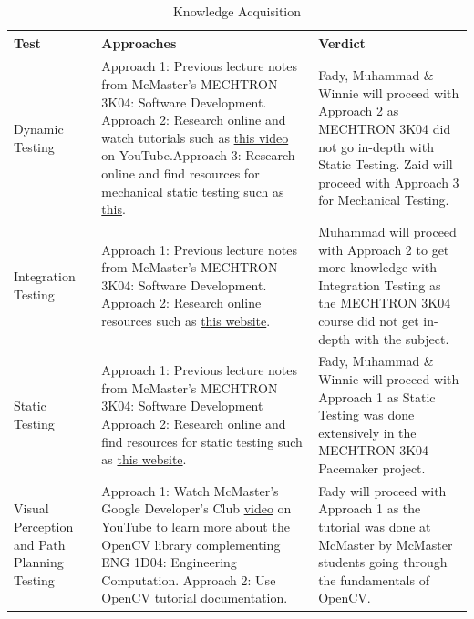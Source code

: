 \documentclass[12pt, titlepage]{article}
\begin{document}
\begin{table}[!h]
\begin{center}
\caption {Knowledge Acquisition}
\label{KnowledgeTable}

\begin{tabular}{ | m{3cm} | m{7cm} | m{4cm} | }

\hline
Test & Approaches & Verdict \\
\hline
Dynamic Testing & 
Approach 1: Previous lecture notes from McMaster's MECHTRON 3K04: Software Development. \newline Approach 2: Research online and watch tutorials such as \href{https://www.youtube.com/watch?v=ePMjdL4PE5M}{this video} on YouTube.\newline Approach 3: Research online and find resources for mechanical static testing such as \href{https://www.sciencedirect.com/topics/materials-science/dynamic-mechanical-analysis}{this}.& Fady, Muhammad \& Winnie will proceed with Approach 2 as MECHTRON 3K04 did not go in-depth with Static Testing. Zaid will proceed with Approach 3 for Mechanical Testing.  \\
\hline
Integration Testing & 
Approach 1: Previous lecture notes from McMaster's MECHTRON 3K04: Software Development. \newline Approach 2: Research online resources such as \href{https://www.simplexitypd.com/blog/five-tips-for-mechatronic-system-integration}{this website}. & Muhammad will proceed with Approach 2 to get more knowledge with Integration Testing as the MECHTRON 3K04 course did not get in-depth with the subject. \\
\hline
Static Testing & 
Approach 1: Previous lecture notes from McMaster's MECHTRON 3K04: Software Development \newline Approach 2: Research online and find resources for static testing such as \href{https://www.guru99.com/testing-review.html}{this website}. & Fady, Muhammad \& Winnie will proceed with Approach 1 as Static Testing was done extensively in the MECHTRON 3K04 Pacemaker project.\\
\hline
 Visual Perception and Path Planning Testing & Approach 1: Watch McMaster's Google Developer's Club \href{https://www.youtube.com/watch?v=Zrw5eCfnSOM}{video} on YouTube to learn more about the OpenCV library complementing ENG 1D04: Engineering Computation.  \newline Approach 2: Use OpenCV \href{https://docs.opencv.org/4.x/d9/df8/tutorial_root.html}{tutorial documentation}. & Fady will proceed with Approach 1 as the tutorial was done at McMaster by McMaster students going through the fundamentals of OpenCV.\\

\end{tabular}
\end{center}
\end{table}
\end{document}
